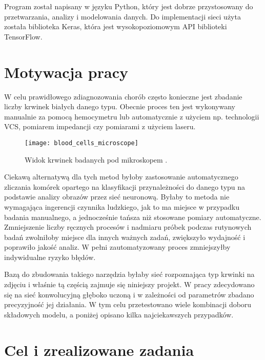 Program został napisany w języku Python, który jest dobrze przystosowany do przetwarzania, analizy i modelowania danych. Do implementacji sieci użyta została biblioteka Keras, która jest wysokopoziomowym API biblioteki TensorFlow.

\section{Motywacja pracy}
\label{sec:motywacja_pracy}

W celu prawidłowego zdiagnozowania chorób często konieczne jest zbadanie liczby krwinek białych danego typu. Obecnie proces ten jest wykonywany manualnie za pomocą hemocymetru lub automatycznie z użyciem np. technologii VCS, pomiarem impedancji czy pomiarami z użyciem laseru. 

\begin{figure}[h]
	\centering
		\texttt{[image: blood\_cells\_microscope]}
	\caption{Widok krwinek badanych pod mikroskopem \cite{cells_microscope}.}
\end{figure}

Ciekawą alternatywą dla tych metod byłoby zastosowanie automatycznego zliczania komórek opartego na klasyfikacji przynależności do danego typu na podstawie analizy obrazów przez sieć neuronową. Byłaby to metoda nie wymagająca ingerencji czynnika ludzkiego, jak to ma miejsce w przypadku badania manualnego, a jednocześnie tańsza niż stosowane pomiary automatyczne. Zmniejszenie liczby ręcznych procesów i nadmiaru próbek podczas rutynowych badań zwolniłoby miejsce dla innych ważnych zadań, zwiększyło wydajność i poprawiło jakość analiz. W pełni zautomatyzowany proces zmniejszyłby indywidualne ryzyko błędów.

Bazą do zbudowania takiego narzędzia byłaby sieć rozpoznająca typ krwinki na zdjęciu i właśnie tą częścią zajmuje się niniejszy projekt. W pracy zdecydowano się na sieć konwolucyjną głęboko uczoną i w zależności od parametrów zbadano precyzyjność jej działania. W tym celu przetestowano wiele kombinacji doboru składowych modelu, a poniżej opisano kilka najciekawszych przypadków.

\section{Cel i zrealizowane zadania}
\label{sec:cel_i_zrealizowane_zadania}

